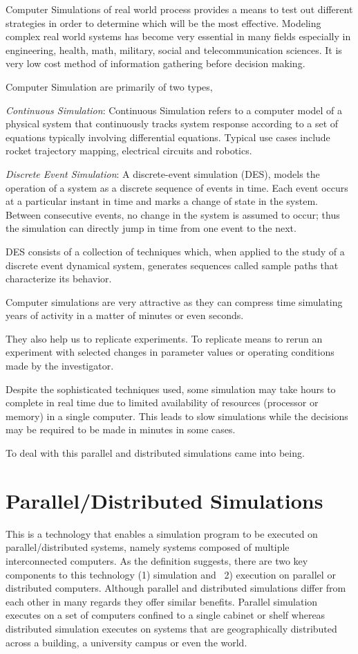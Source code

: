 \documentclass[12pt,a4paper]{article}
\begin{document}
	Computer Simulations of real world process provides a means to test out different strategies in order to determine which will be the most effective. Modeling complex real world systems has become very essential in many fields especially in engineering, health, math, military, social and telecommunication sciences. It is very low cost method of information gathering before decision making. 
	
	Computer Simulation are primarily of two types,
	
	\emph{Continuous Simulation}: Continuous Simulation refers to a computer model of a physical system that continuously tracks system response according to a set of equations typically involving differential equations.	Typical use cases include rocket trajectory mapping, electrical circuits and robotics.
	
	\emph{Discrete Event Simulation}: A discrete-event simulation (DES), models the operation of a system as a discrete sequence of events in time. Each event occurs at a particular instant in time and marks a change of state in the system. Between consecutive events, no change in the system is assumed to occur; thus the simulation can directly jump in time from one event to the next.
	
	DES consists of a collection of techniques which, when applied to the study of a discrete event dynamical system, generates sequences called sample paths that characterize its behavior.
		
	Computer simulations are very attractive as they can compress time simulating years of activity in a matter of minutes or even seconds.
	
	They also help us to replicate experiments. To replicate means to rerun an experiment with selected changes in parameter values or operating conditions made by the investigator. 
	
	Despite the sophisticated techniques used, some simulation may take hours to complete in real time due to limited availability of resources (processor or memory) in a single computer. This leads to slow simulations while the decisions may be required to be made in minutes in some cases.
	
	To deal with this parallel and distributed simulations came into being.
	\newpage
	
	\section{Parallel/Distributed Simulations}
	This is a technology that enables a simulation program to be executed on parallel/distributed systems, namely systems composed of multiple interconnected computers. As the definition suggests, there are two key components to this technology (1) simulation and ~2) execution on parallel or distributed computers. Although parallel and distributed simulations differ from each other in many regards they offer similar benefits. Parallel simulation executes on a set of computers confined to a single cabinet or shelf whereas distributed simulation executes on systems that are geographically distributed across a building, a university campus or even the world.
\end{document}
